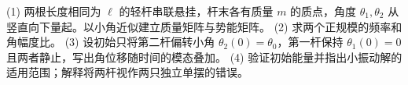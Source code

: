 (1) 两根长度相同为 \(\ell\) 的轻杆串联悬挂，杆末各有质量 \(m\) 的质点，角度 \(\theta_1,\theta_2\) 从竖直向下量起。以小角近似建立质量矩阵与势能矩阵。
(2) 求两个正规模的频率和角幅度比。
(3) 设初始只将第二杆偏转小角 \(\theta_2(0)=\theta_0\)，第一杆保持 \(\theta_1(0)=0\) 且两者静止，写出角位移随时间的模态叠加。
(4) 验证初始能量并指出小振动解的适用范围；解释将两杆视作两只独立单摆的错误。
